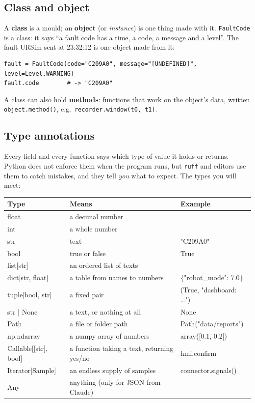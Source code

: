 \documentclass[10pt]{article}
\newcommand{\brkus}{\textunderscore\allowbreak}
\newcommand{\f}[1]{\texttt{\let\_\brkus #1}}
\begin{document}
\subsection{Class and object}
A \textbf{class} is a mould; an \textbf{object} (or \emph{instance}) is one thing made with it.
\f{FaultCode} is a class: it says ``a fault code has a time, a code, a message and a level''.
The fault URSim sent at 23:32:12 is one object made from it:
\begin{lstlisting}
fault = FaultCode(code="C209A0", message="[UNDEFINED]", level=Level.WARNING)
fault.code        # -> "C209A0"
\end{lstlisting}
A class can also hold \textbf{methods}: functions that work on the object's data, written
\f{object.method()}, e.g.\ \f{recorder.window(t0, t1)}.

\subsection{Type annotations}
Every field and every function says which type of value it holds or returns. Python does not
enforce them when the program runs, but \f{ruff} and editors use them to catch mistakes, and
they tell \emph{you} what to expect. The types you will meet:
\begin{center}\footnotesize
\begin{tabularx}{\linewidth}{@{}>{\ttfamily}l X >{\ttfamily}l@{}}
\toprule
\textrm{\textbf{Type}} & \textbf{Means} & \textrm{\textbf{Example}} \\
\midrule
float & a decimal number & 0.6727 \\
int & a whole number & 5 \\
str & text & "C209A0" \\
bool & true or false & True \\
list[str] & an ordered list of texts & ["a", "b"] \\
dict[str, float] & a table from names to numbers & \{"robot\_mode": 7.0\} \\
tuple[bool, str] & a fixed pair & (True, "dashboard: \ldots") \\
str | None & a text, or nothing at all & None \\
Path & a file or folder path & Path("data/reports") \\
np.ndarray & a numpy array of numbers & array([0.1, 0.2]) \\
Callable[[str], bool] & a function taking a text, returning yes/no & hmi.confirm \\
Iterator[Sample] & an endless supply of samples & connector.signals() \\
Any & anything (only for JSON from Claude) & \\
\bottomrule
\end{tabularx}
\end{center}
\end{document}
